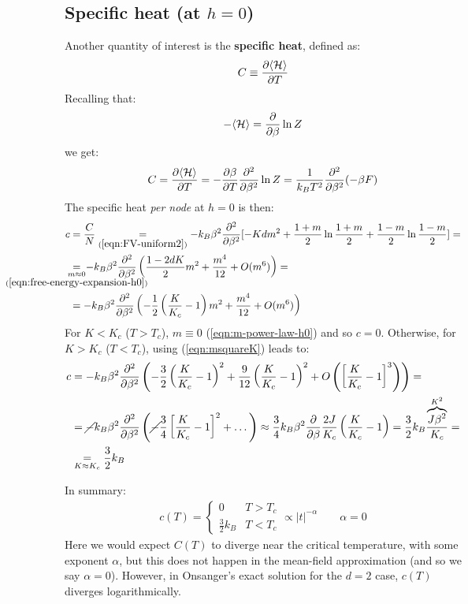 \documentclass[../../main.tex]{subfiles}
\begin{document}
\subsection{Specific heat (at $h=0$)}
Another quantity of interest is the \textbf{specific heat}, defined as:
\begin{align*}
    C \equiv \pdv{\langle \mathcal{H} \rangle}{T}
\end{align*} 
Recalling that:
\begin{align*}
    -\langle \mathcal{H} \rangle = \pdv{\beta} \ln Z
\end{align*}
we get:
\begin{align*}
    C = \pdv{\langle \mathcal{H} \rangle}{T} = -\pdv{\beta}{T} \pdv[2]{\beta} \ln Z = \frac{1}{k_B T^2} \pdv[2]{\beta} (-\beta F) 
\end{align*}
The specific heat \textit{per node} at $h=0$ is then:
\begin{align*}
    c &= \frac{C}{N} \underset{(\ref{eqn:FV-uniform2})}{=} -k_B \beta^2 \pdv[2]{\beta} [-K d m^2 + \frac{1+m}{2}\ln\frac{1+m}{2} + \frac{1-m}{2}\ln\frac{1-m}{2}] =\\
    &\underset{\mathclap{\substack{m\approx0\\(\ref{eqn:free-energy-expansion-h0})}}}{=} \> -k_B \beta^2 \pdv[2]{\beta} \left(\frac{1-2dK}{2} m^2 + \frac{m^4}{12} + O(m^6)\right) =\\
    &= -k_B \beta^2 \pdv[2]{\beta} \left(-\frac{1}{2}\left(\frac{K}{K_c} -1 \right)m^2 + \frac{m^4}{12} + O(m^6) \right)
\end{align*}
For $K < K_c$ ($T > T_c$), $m\equiv 0$ (\ref{eqn:m-power-law-h0}) and so $c=0$. Otherwise, for $K > K_c$ ($T < T_c$), using (\ref{eqn:msquareK}) leads to:
\begin{align*}
    c &= -k_B \beta^2 \pdv[2]{\beta} \left(-\frac{3}{2}\left(\frac{K}{K_c}-1 \right)^2 + \frac{9}{12}\left(\frac{K}{K_c} -1\right)^2 + O\left(\left[\frac{K}{K_c}-1 \right]^3\right) \right) =\\
    &= \cancel{-}k_B \beta^2 \pdv[2]{\beta} \left(\cancel{-}\frac{3}{4} \left[\frac{K}{K_c} - 1 \right]^2 + \dots \right) \approx \frac{3}{4}  k_B \beta^2 \pdv{\beta} \frac{2J}{K_c}  \left(\frac{K}{K_c}-1 \right) = \frac{3}{2} k_B \frac{\overbrace{J \beta^2}^{K^2}}{K_c} =\\
    &\underset{K \approx K_c}{=} \frac{3}{2}k_B 
\end{align*}

In summary:
\begin{align}\label{eqn:specific-heat-power-law}
    c(T) = \begin{cases}
        0 & T > T_c\\
        \frac{3}{2}k_B & T<T_c 
    \end{cases} \propto |t|^{-\alpha} \qquad \alpha = 0 %
\end{align} %
Here we would expect $C(T)$ to diverge near the critical temperature, with some exponent $\alpha$, but this does not happen in the mean-field approximation (and so we say $\alpha=0$). However, in Onsanger's exact solution for the $d=2$ case, $c(T)$ diverges logarithmically. 
\end{document}
